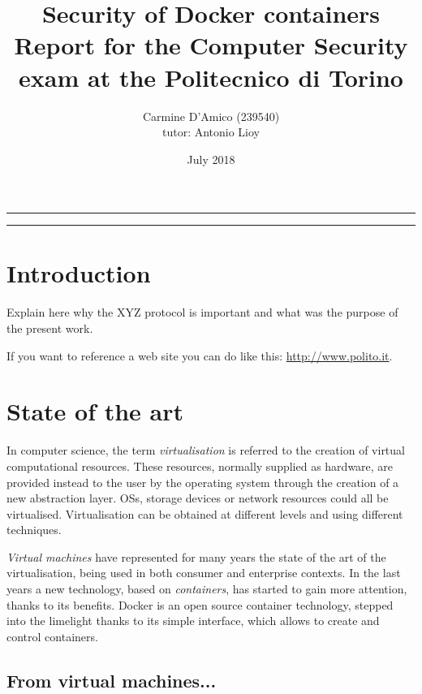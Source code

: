 \documentclass[a4paper,12pt]{article}
\begin{document}
\title{Security of Docker containers \\
{\normalsize Report for the Computer Security exam at the Politecnico di Torino}
} \author{Carmine D'Amico (239540) \\
{\normalsize tutor: Antonio Lioy} }
\date{July 2018}
\maketitle

\vfill

\rule{\textwidth}{1pt}

\tableofcontents

\rule{\textwidth}{1pt}

\vfill

\newpage

\section{Introduction}

Explain here why the XYZ protocol is important and what was the purpose of the
present work.

If you want to reference a web site you can do like this:
\url{http://www.polito.it}.

\newpage

\section{State of the art}

In computer science, the term \textit{virtualisation} is referred to the
creation of virtual computational resources. These resources, normally supplied
as hardware, are provided instead to the user by the operating system through
the creation of a new abstraction layer. OSs, storage devices or network
resources could all be virtualised. Virtualisation can be obtained at different
levels and using different techniques. \par\textit{Virtual machines} have
represented for many years the state of the art of the virtualisation, being
used in both consumer and enterprise contexts. In the last years a new
technology, based on \textit{containers}, has started to gain more attention,
thanks to its benefits. Docker is an open source container technology, stepped
into the limelight thanks to its simple interface, which allows to create and
control containers. 

\subsection{From virtual machines...}
\end{document}
